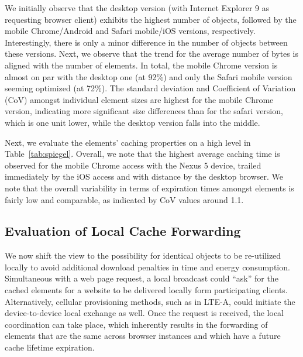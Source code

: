 \documentclass[letterpaper,conference]{IEEEtran}
\begin{document}
We initially observe that the desktop version (with Internet Explorer 9 as requesting browser client) exhibits the highest number of objects, followed by the mobile Chrome/Android and Safari mobile/iOS versions, respectively. 
Interestingly, there is only a minor difference in the number of objects between these versions.
Next, we observe that the trend for the average number of bytes is aligned with the number of elements. 
In total, the mobile Chrome version is almost on par with the desktop one (at 92\%) and only the Safari mobile version seeming optimized (at 72\%).
The standard deviation and Coefficient of Variation (CoV) amongst individual element sizes are highest for the mobile Chrome version, indicating more significant size differences than for the safari version, which is one unit lower, while the desktop version falls into the middle.

Next, we evaluate the elements' caching properties on a high level in Table~\ref{tab:spiegel}. 
Overall, we note that the highest average caching time is observed for the mobile Chrome access with the Nexus 5 device, trailed immediately by the iOS access and with distance by the desktop browser.
We note that the overall variability in terms of expiration times amongst elements is fairly low and comparable, as indicated by CoV values around 1.1.

\subsection{Evaluation of Local Cache Forwarding}
We now shift the view to the possibility for identical objects to be re-utilized locally to avoid additional download penalties in time and energy consumption.
Simultaneous with a web page request, a local broadcast could ``ask'' for the cached elements for a website to be delivered locally form participating clients. Alternatively, cellular provisioning methods, such as in LTE-A, could initiate the device-to-device local exchange as well.
Once the request is received, the local coordination can take place, which inherently results in the forwarding of elements that are the same across browser instances and which have a future cache lifetime expiration.
\end{document}
